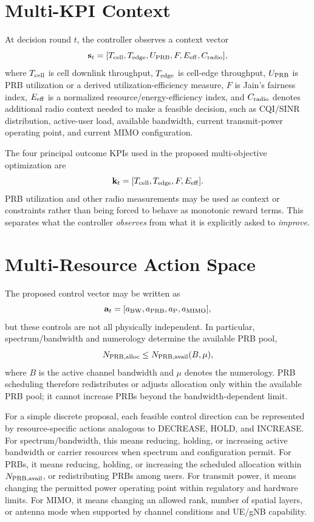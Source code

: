 \documentclass[conference]{IEEEtran}
\begin{document}
\section{Multi-KPI Context}
At decision round $t$, the controller observes a context vector
\begin{equation}
\mathbf{s}_t=[T_{\rm cell},T_{\rm edge},U_{\rm PRB},F,E_{\rm eff},C_{\rm radio}],
\end{equation}
where $T_{\rm cell}$ is cell downlink throughput, $T_{\rm edge}$ is cell-edge throughput, $U_{\rm PRB}$ is PRB utilization or a derived utilization-efficiency measure, $F$ is Jain's fairness index, $E_{\rm eff}$ is a normalized resource/energy-efficiency index, and $C_{\rm radio}$ denotes additional radio context needed to make a feasible decision, such as CQI/SINR distribution, active-user load, available bandwidth, current transmit-power operating point, and current MIMO configuration.

The four principal outcome KPIs used in the proposed multi-objective optimization are
\begin{equation}
\mathbf{k}_t=[T_{\rm cell},T_{\rm edge},F,E_{\rm eff}].
\end{equation}
PRB utilization and other radio measurements may be used as context or constraints rather than being forced to behave as monotonic reward terms. This separates what the controller \emph{observes} from what it is explicitly asked to \emph{improve}.

\section{Multi-Resource Action Space}
The proposed control vector may be written as
\begin{equation}
\mathbf{a}_t=
[a_{\rm BW},a_{\rm PRB},a_{\rm P},a_{\rm MIMO}],
\end{equation}
but these controls are not all physically independent. In particular, spectrum/bandwidth and numerology determine the available PRB pool,
\begin{equation}
N_{\rm PRB,alloc}\leq N_{\rm PRB,avail}(B,\mu),
\end{equation}
where $B$ is the active channel bandwidth and $\mu$ denotes the numerology. PRB scheduling therefore redistributes or adjusts allocation only within the available PRB pool; it cannot increase PRBs beyond the bandwidth-dependent limit.

For a simple discrete proposal, each feasible control direction can be represented by resource-specific actions analogous to DECREASE, HOLD, and INCREASE. For spectrum/bandwidth, this means reducing, holding, or increasing active bandwidth or carrier resources when spectrum and configuration permit. For PRBs, it means reducing, holding, or increasing the scheduled allocation within $N_{\rm PRB,avail}$, or redistributing PRBs among users. For transmit power, it means changing the permitted power operating point within regulatory and hardware limits. For MIMO, it means changing an allowed rank, number of spatial layers, or antenna mode when supported by channel conditions and UE/gNB capability.
\end{document}
